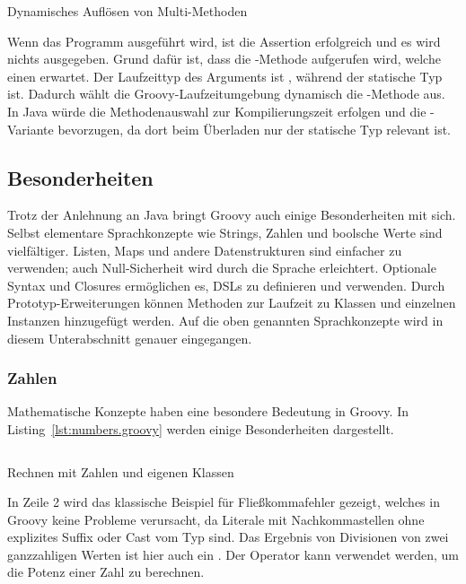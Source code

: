 \documentclass[a4paper]{article}
\newcommand{\codelisting}[3]{
\begin{listing}[ht]
	\inputminted{#1}{#1/#2}
	\caption{#3}
	\label{lst:#2}
\end{listing}
}
\begin{document}
\codelisting{groovy}{multi-methods.groovy}{Dynamisches Auflösen von Multi-Methoden}

Wenn das Programm ausgeführt wird, ist die Assertion erfolgreich und es wird nichts ausgegeben.
Grund dafür ist, dass die -Methode aufgerufen wird, welche einen  erwartet.
Der Laufzeittyp des Arguments  ist , während der statische Typ  ist.
Dadurch wählt die Groovy-Laufzeitumgebung dynamisch die -Methode aus.
In Java würde die Methodenauswahl zur Kompilierungszeit erfolgen und die -Variante bevorzugen, da dort beim Überladen nur der statische Typ relevant ist.

\subsection{Besonderheiten}\label{subsec:besonderheiten}

Trotz der Anlehnung an Java bringt Groovy auch einige Besonderheiten mit sich.
Selbst elementare Sprachkonzepte wie Strings, Zahlen und boolsche Werte sind vielfältiger.
Listen, Maps und andere Datenstrukturen sind einfacher zu verwenden; auch Null-Sicherheit wird durch die Sprache erleichtert.
Optionale Syntax und Closures ermöglichen es, DSLs zu definieren und verwenden.
Durch Prototyp-Erweiterungen können Methoden zur Laufzeit zu Klassen und einzelnen Instanzen hinzugefügt werden.
Auf die oben genannten Sprachkonzepte wird in diesem Unterabschnitt genauer eingegangen.

\subsubsection{Zahlen}\label{subsubsec:zahlen}

Mathematische Konzepte haben eine besondere Bedeutung in Groovy.
In Listing~\ref{lst:numbers.groovy} werden einige Besonderheiten dargestellt.

\codelisting{groovy}{numbers.groovy}{Rechnen mit Zahlen und eigenen Klassen}

In Zeile 2 wird das klassische Beispiel für Fließkommafehler gezeigt, welches in Groovy keine Probleme verursacht, da Literale mit Nachkommastellen ohne explizites Suffix oder Cast vom Typ  sind.
Das Ergebnis von Divisionen von zwei ganzzahligen Werten ist hier auch ein .
Der Operator \code{**} kann verwendet werden, um die Potenz einer Zahl zu berechnen.
\end{document}
